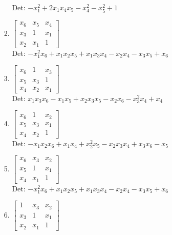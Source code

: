 \documentclass[12pt]{article}
\begin{document}
\begin{enumerate}
\begin{enumerate}
\begin{enumerate}
Det: $- x_{1}^{2} + 2 x_{1} x_{4} x_{5} - x_{4}^{2} - x_{5}^{2} + 1$\\


\item $\displaystyle \left[\begin{matrix}x_{6} & x_{5} & x_{4}\\x_{3} & 1 & x_{1}\\x_{2} & x_{1} & 1\end{matrix}\right]$\\

Det: $- x_{1}^{2} x_{6} + x_{1} x_{2} x_{5} + x_{1} x_{3} x_{4} - x_{2} x_{4} - x_{3} x_{5} + x_{6}$\\


\item $\displaystyle \left[\begin{matrix}x_{6} & 1 & x_{3}\\x_{5} & x_{3} & 1\\x_{4} & x_{2} & x_{1}\end{matrix}\right]$\\

Det: $x_{1} x_{3} x_{6} - x_{1} x_{5} + x_{2} x_{3} x_{5} - x_{2} x_{6} - x_{3}^{2} x_{4} + x_{4}$\\


\item $\displaystyle \left[\begin{matrix}x_{6} & 1 & x_{2}\\x_{5} & x_{3} & x_{1}\\x_{4} & x_{2} & 1\end{matrix}\right]$\\

Det: $- x_{1} x_{2} x_{6} + x_{1} x_{4} + x_{2}^{2} x_{5} - x_{2} x_{3} x_{4} + x_{3} x_{6} - x_{5}$\\


\item $\displaystyle \left[\begin{matrix}x_{6} & x_{3} & x_{2}\\x_{5} & 1 & x_{1}\\x_{4} & x_{1} & 1\end{matrix}\right]$\\

Det: $- x_{1}^{2} x_{6} + x_{1} x_{2} x_{5} + x_{1} x_{3} x_{4} - x_{2} x_{4} - x_{3} x_{5} + x_{6}$\\


\item $\displaystyle \left[\begin{matrix}1 & x_{3} & x_{2}\\x_{3} & 1 & x_{1}\\x_{2} & x_{1} & 1\end{matrix}\right]$\\


\end{enumerate}
\end{enumerate}
\end{enumerate}
\end{document}
